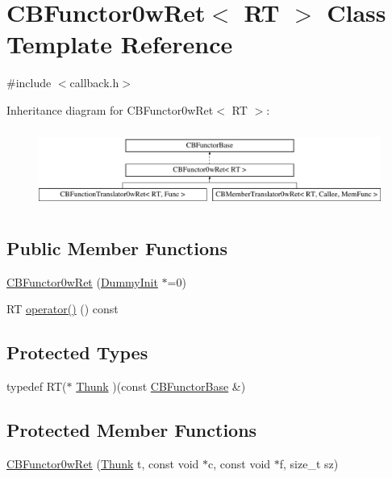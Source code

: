 \hypertarget{class_c_b_functor0w_ret}{\section{C\+B\+Functor0w\+Ret$<$ R\+T $>$ Class Template Reference}
\label{class_c_b_functor0w_ret}
}


{\ttfamily \#include $<$callback.\+h$>$}

Inheritance diagram for C\+B\+Functor0w\+Ret$<$ R\+T $>$\+:\begin{figure}[H]
\begin{center}
\leavevmode
\includegraphics[height=2.600619cm]{class_c_b_functor0w_ret}
\end{center}
\end{figure}
\subsection*{Public Member Functions}
\begin{DoxyCompactItemize}
\item 
\hyperlink{class_c_b_functor0w_ret_a9df617054ecde8871b218f99569b558e}{C\+B\+Functor0w\+Ret} (\hyperlink{class_c_b_functor_base_1_1_dummy_init}{Dummy\+Init} $\ast$=0)
\item 
R\+T \hyperlink{class_c_b_functor0w_ret_af1ef6bed1d39de94804f28ed204a1fb4}{operator()} () const 
\end{DoxyCompactItemize}
\subsection*{Protected Types}
\begin{DoxyCompactItemize}
\item 
typedef R\+T($\ast$ \hyperlink{class_c_b_functor0w_ret_a48add6974ead9bfbfb0849a219e40603}{Thunk} )(const \hyperlink{class_c_b_functor_base}{C\+B\+Functor\+Base} \&)
\end{DoxyCompactItemize}
\subsection*{Protected Member Functions}
\begin{DoxyCompactItemize}
\item 
\hyperlink{class_c_b_functor0w_ret_a977607abccd2bc7813db27b2fc6ccfbc}{C\+B\+Functor0w\+Ret} (\hyperlink{class_c_b_functor0w_ret_a48add6974ead9bfbfb0849a219e40603}{Thunk} t, const void $\ast$c, const void $\ast$f, size\+\_\+t sz)
\end{DoxyCompactItemize}
